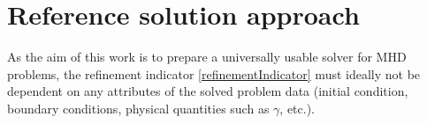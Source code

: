\section{Reference solution approach}
As the aim of this work is to prepare a universally usable solver for MHD problems, the refinement indicator \ref{refinementIndicator} must ideally not be dependent on any attributes of the solved problem data (initial condition, boundary conditions, physical quantities such as $\gamma$, etc.).
